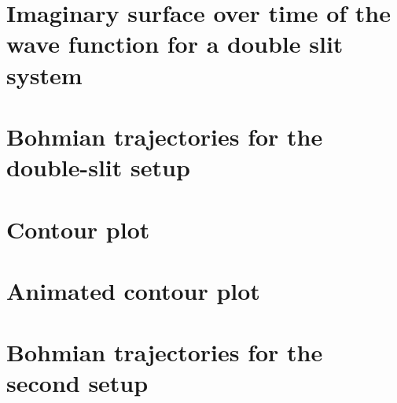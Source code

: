 \documentclass[10pt, reqno]{article}
\begin{document}
\section{Imaginary surface over time of the wave function for a double slit system}
\label{appendix:imaginary-surface}

\pagebreak 

\section{Bohmian trajectories for the double-slit setup}
\label{appendix:bohmian-trajectories}

\pagebreak 

\section{Contour plot}
\label{appendix:contour-plot}

\pagebreak 

\section{Animated contour plot}
\label{appendix:contour-plot-animated}

\pagebreak 

\section{Bohmian trajectories for the second setup}
\label{appendix:secondary-trajectories}

\pagebreak 
\end{document}
